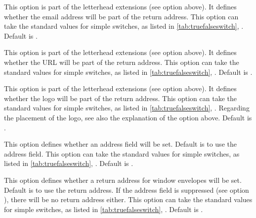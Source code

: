 \begin{Declaration}
\end{Declaration}
%
This option is part of the letterhead extensions (see option
 above). It defines whether the
email address will be part of the return address.  This option can take
the standard values for simple switches, as listed in
\autoref{tab:truefalseswitch},
. Default is .
%
%

\begin{Declaration}
\end{Declaration}
%
This option is part of the letterhead extensions (see option
 above). It defines whether the
URL will be part of the return address.  This option can take
the standard values for simple switches, as listed in
\autoref{tab:truefalseswitch},
. Default is .
%
%

\begin{Declaration}
\end{Declaration}
%
This option is part of the letterhead extensions (see option
 above). It defines whether the logo will be part of
the return address.  This option can take the standard values for
simple switches, as listed in
\autoref{tab:truefalseswitch},
. Regarding the placement
of the logo, see also the explanation of the option 
above. Default is .
%
%

\begin{Declaration}
\end{Declaration}
%
This option defines whether an address field will be set. Default is
to use the address field. This option can take the standard values for
simple switches, as listed in
\autoref{tab:truefalseswitch},
. Default is
.
%
%

\begin{Declaration}
\end{Declaration}
%
This option defines whether a return address for window envelopes will
be set. Default is to use the return address. If the address field is
suppressed (see option ), there will be no return
address either. This option can take the standard values for simple
switches, as listed in \autoref{tab:truefalseswitch},
.
Default is .
%
%

